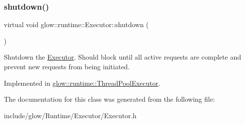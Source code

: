 \subsubsection{\texorpdfstring{shutdown()}{shutdown()}}
{\footnotesize\ttfamily virtual void glow\+::runtime\+::\+Executor\+::shutdown (\begin{DoxyParamCaption}{ }\end{DoxyParamCaption})\hspace{0.3cm}{\ttfamily [pure virtual]}}

Shutdown the \hyperlink{classglow_1_1runtime_1_1_executor}{Executor}. Should block until all active requests are complete and prevent new requests from being initiated. 

Implemented in \hyperlink{classglow_1_1runtime_1_1_thread_pool_executor_ad77508bfa19d1ebaad7547b1bbce68f8}{glow\+::runtime\+::\+Thread\+Pool\+Executor}.



The documentation for this class was generated from the following file\+:\begin{DoxyCompactItemize}
\item 
include/glow/\+Runtime/\+Executor/Executor.\+h\end{DoxyCompactItemize}
